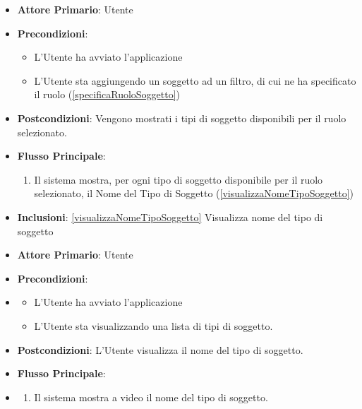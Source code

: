 \begin{itemize}
      \item \textbf{Attore Primario}: Utente
      \item \textbf{Precondizioni}: 
      \begin{itemize}
            \item L'Utente ha avviato l'applicazione
            \item L'Utente sta aggiungendo un soggetto ad un filtro, di cui ne ha specificato il ruolo (\ref{specificaRuoloSoggetto})
      \end{itemize}
      \item \textbf{Postcondizioni}: Vengono mostrati i tipi di soggetto disponibili per il ruolo selezionato.
      \item \textbf{Flusso Principale}:
            \begin{enumerate}
                  \item Il sistema mostra, per ogni tipo di soggetto disponibile per il ruolo selezionato, il Nome del Tipo di Soggetto (\ref{visualizzaNomeTipoSoggetto})
            \end{enumerate}
      \item \textbf{Inclusioni}: \ref{visualizzaNomeTipoSoggetto} Visualizza nome del tipo di soggetto
\end{itemize}

\begin{itemize}
      \item \textbf{Attore Primario}: Utente
      \item \textbf{Precondizioni}:
      \item \begin{itemize}
            \item L'Utente ha avviato l'applicazione
            \item L'Utente sta visualizzando una lista di tipi di soggetto.
      \end{itemize}
      \item \textbf{Postcondizioni}: L'Utente visualizza il nome del tipo di soggetto.
      \item \textbf{Flusso Principale}:
      \item \begin{enumerate}
            \item Il sistema mostra a video il nome del tipo di soggetto.
      \end{enumerate}
\end{itemize}

